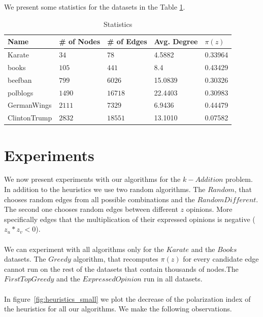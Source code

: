 \vspace{23pt}

We present some statistics for the datasets in the Table \ref{tab:statistics}.
\vspace{36pt}

\begin{table}[H]
 \centering
 \caption{Statistics}
 \label{tab:statistics}
 \begin{tabular}{| l || l | l | l | l |}
 \hline
  Name & \# of Nodes & \# of Edges & Avg. Degree & $\pi(z)$\\
  \hline
  \hline
  Karate & $34$ & $78$ & 4.5882 &  0.33964\\
  \hline
    books & $105$ & $441$ & 8.4 &  0.43429\\
  \hline
    beefban & $799$ & $6026$ & 15.0839 &  0.30326\\
  \hline
  polblogs & $1490$ & $16718$ & 22.4403 &  0.30983\\
  \hline
  GermanWings & $2111$ & $7329$ & 6.9436 &  0.44479\\
  \hline
  ClintonTrump & $2832$ & $18551$ & 13.1010 &  0.07582\\
  \hline
 \end{tabular}
 \end{table}
 
\clearpage

\section{Experiments}
\label{sec:experim}

We now present experiments with our algorithms for the $k-Addition$ problem. In addition to the heuristics we use two random algorithms. The $Random$, that chooses random edges from all possible combinations and the $RandomDifferent$. The second one chooses random edges between different $z$ opinions. More specifically edges that the multiplication of their expressed opinions is negative ($z_u*z_v < 0$). 
\\
\\
We can experiment with all algorithms only for the $Karate$ and the $Books$ datasets. The $Greedy$ algorithm, that recomputes $\pi(z)$ for every candidate edge cannot run on the rest of the datasets that contain thousands of nodes.The $FirstTopGreedy$ and the $Expressed Opinion$ run in all datasets.
\\
\\
In figure~\ref{fig:heuristics_small} we plot the decrease of the polarization index of the heuristics for all our algorithms. We make the following observations.
\clearpage

